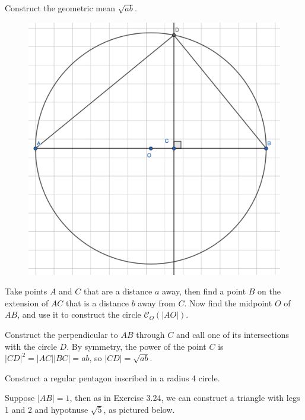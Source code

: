 \documentclass[twoside,10pt]{article}
\begin{document}
\begin{exer}[3.26]
Construct the geometric mean $\sqrt{ab} $.
\end{exer}

\begin{figure}[H]
	\centering
	\includegraphics[scale=0.3]{fig/26}
\end{figure}

Take points $A$ and $C$ that are a distance $a$ away, then find a point $B$ on the extension of $AC$ that is a distance $b$ away from $C$. Now find the midpoint $O$ of $AB$, and use it to construct the circle $\mathcal{C}_{O}(|AO|)$.

Construct the perpendicular to $AB$ through $C$ and call one of its intersections with the circle $D$. By symmetry, the power of the point $C$ is $|CD|^2 = |AC| |BC| = a b$, so $|CD| = \sqrt{ab} $.

\newpage

\begin{exer}[3.33]
Construct a regular pentagon inscribed in a radius 4 circle.
\end{exer}

Suppose $|AB|=1$, then as in Exercise 3.24, we can construct a triangle with legs 1 and 2 and hypotnuse $\sqrt{5} $, as pictured below.
\end{document}
